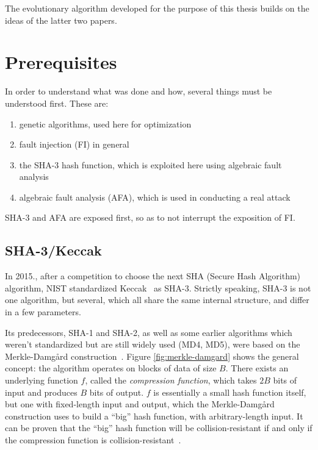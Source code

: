 \documentclass[times, utf8, diplomski]{fer}
\begin{document}
The evolutionary algorithm developed for the purpose of this thesis builds on
the ideas of the latter two papers.



\chapter{Prerequisites}\label{ch:prerequisites}
In order to understand what was done and how, several things must be understood
first. These are:
\begin{enumerate}
    \item genetic algorithms, used here for optimization
    \item fault injection (FI) in general
    \item the SHA-3 hash function, which is exploited here using algebraic fault analysis
    \item algebraic fault analysis (AFA), which is used in conducting a real attack
\end{enumerate}

SHA-3 and AFA are exposed first, so as to not interrupt the exposition of FI.


\section{SHA-3/Keccak}\label{sec:keccak}
In 2015., after a competition to choose the next SHA (Secure Hash Algorithm)
algorithm, NIST standardized Keccak~\cite{keccak_reference} as SHA-3.
Strictly speaking, SHA-3 is not one algorithm, but several, which all share
the same internal structure, and differ in a few parameters.

Its predecessors, SHA-1 and SHA-2, as well as some earlier algorithms which
weren't standardized but are still widely used (MD4, MD5), were based on the
Merkle-Damgård construction~\cite{merkle-damgard_revisited}. Figure \ref{fig:merkle-damgard}
shows the general concept: the algorithm operates on blocks of data of size $B$.
There exists an underlying function $f$, called the \emph{compression function},
which takes $2B$ bits of input and produces $B$ bits of output. $f$ is essentially
a small hash function itself, but one with fixed-length input and output, which
the Merkle-Damgård construction uses to build a ``big'' hash function, with
arbitrary-length input. It can be proven that the ``big'' hash function will
be collision-resistant if and only if the compression function is
collision-resistant~\cite{merkle-damgard_security}.
\end{document}
